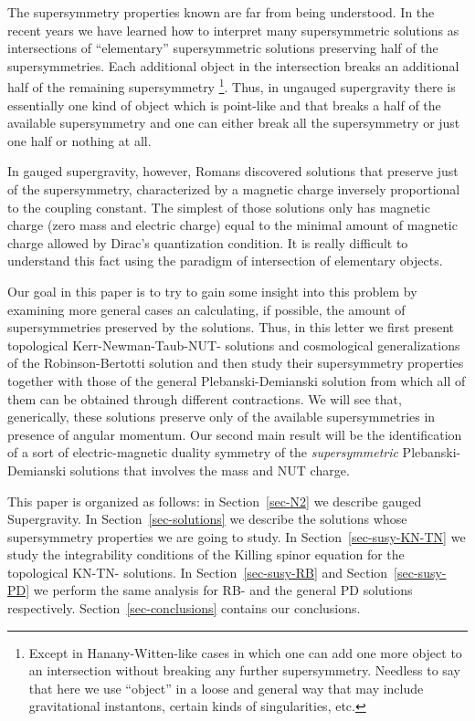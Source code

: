 \documentclass[12pt,a4paper]{article}
\begin{document}
The supersymmetry properties known are far from being understood.  In
the recent years we have learned how to interpret many supersymmetric
solutions as intersections of ``elementary'' supersymmetric solutions
preserving half of the supersymmetries. Each additional object in the
intersection breaks an additional half of the remaining supersymmetry
\footnote{Except in Hanany-Witten-like cases in which one can add one
  more object to an intersection without breaking any further
  supersymmetry. Needless to say that here we use ``object'' in a
  loose and general way that may include gravitational instantons,
  certain kinds of singularities, etc.}. Thus, in \coordHE{} ungauged
supergravity there is essentially one kind of object which is
point-like and that breaks a half of the available supersymmetry and
one can either break all the supersymmetry or just one half or nothing
at all.

In \coordHE{} gauged supergravity, however, Romans discovered solutions
that preserve just \coordHE{} of the supersymmetry, characterized by a
magnetic charge inversely proportional to the coupling constant. The
simplest of those solutions only has magnetic charge (zero mass and
electric charge) equal to the minimal amount of magnetic charge
allowed by Dirac's quantization condition. It is really difficult to
understand this fact using the paradigm of intersection of elementary
objects.

Our goal in this paper is to try to gain some insight into this problem
by examining more general cases an calculating, if possible, the
amount of supersymmetries preserved by the solutions. Thus, in this
letter we first present topological Kerr-Newman-Taub-NUT-\coordHE{}
solutions and cosmological generalizations of the Robinson-Bertotti
solution and then study their supersymmetry properties together with
those of the general Plebanski-Demianski solution from which all of
them can be obtained through different contractions. We will see that,
generically, these solutions preserve only \coordHE{} of the available
supersymmetries in presence of angular momentum. Our second main result
will be the identification of a sort of electric-magnetic duality 
symmetry of the {\it supersymmetric} Plebanski-Demianski solutions
that involves the mass and NUT charge.

This paper is organized as follows: in Section~\ref{sec-N2} we
describe \coordHE{} gauged Supergravity. In Section~\ref{sec-solutions}
we describe the solutions whose supersymmetry properties we are going
to study. In Section~\ref{sec-susy-KN-TN} we study the integrability
conditions of the Killing spinor equation for the topological
KN-TN-\coordHE{} solutions. In Section~\ref{sec-susy-RB} and
Section~\ref{sec-susy-PD} we perform the same analysis for RB-\coordHE{}
and the general PD solutions respectively.
Section~\ref{sec-conclusions} contains our conclusions.
\end{document}
